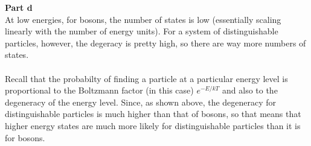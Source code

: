 \documentclass[12pt]{article}
\begin{document}
\begin{flushleft}
\begin{enumerate}
\end{enumerate}

\textbf{Part d}\\
At low energies, for bosons, the number of states is low (essentially scaling linearly with the number of energy units).
For a system of distinguishable particles, however, the degeracy is pretty high, so there are way more numbers of states.\\~\\

Recall that the probabilty of finding a particle at a particular energy level is proportional to the Boltzmann factor (in this case) $e^{-E/kT}$ and also to the degeneracy of the energy level.
Since, as shown above, the degeneracy for distinguishable particles is much higher than that of bosons, so that means that higher energy states are much more likely for distinguishable particles than it is for bosons.



\end{flushleft}
\end{document}

